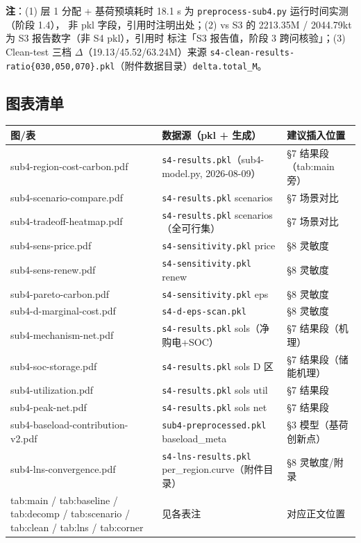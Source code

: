 \documentclass{internal-report}
\begin{document}
\textbf{注}：(1) 层 1 分配 + 基荷预填耗时 18.1 s 为 \texttt{preprocess-sub4.py} 运行时间实测（阶段 1.4），
非 pkl 字段，引用时注明出处；(2) vs S3 的 2213.35M / 2044.79kt 为 S3 报告数字（非 S4 pkl），引用时
标注「S3 报告值，阶段 3 跨问核验」；(3) Clean-test 三档 $\Delta$（19.13/45.52/63.24M）来源
\texttt{s4-clean-results-ratio\{030,050,070\}.pkl}（附件数据目录）\texttt{delta.total\_M}。

\subsection{图表清单}

\begin{center}
\footnotesize
\begin{tabular}{>{\raggedright\arraybackslash}p{5.0cm} >{\raggedright\arraybackslash}p{6.6cm} >{\raggedright\arraybackslash}p{3.2cm}}
\toprule
图/表 & 数据源（pkl + 生成） & 建议插入位置 \\
\midrule
sub4-region-cost-carbon.pdf & \texttt{s4-results.pkl}（sub4-model.py, 2026-08-09） & §7 结果段（tab:main 旁） \\
sub4-scenario-compare.pdf & \texttt{s4-results.pkl} scenarios & §7 场景对比 \\
sub4-tradeoff-heatmap.pdf & \texttt{s4-results.pkl} scenarios（全可行集） & §7 场景对比 \\
sub4-sens-price.pdf & \texttt{s4-sensitivity.pkl} price & §8 灵敏度 \\
sub4-sens-renew.pdf & \texttt{s4-sensitivity.pkl} renew & §8 灵敏度 \\
sub4-pareto-carbon.pdf & \texttt{s4-sensitivity.pkl} eps & §8 灵敏度 \\
sub4-d-marginal-cost.pdf & \texttt{s4-d-eps-scan.pkl} & §8 灵敏度 \\
sub4-mechanism-net.pdf & \texttt{s4-results.pkl} sols（净购电+SOC） & §7 结果段（机理） \\
sub4-soc-storage.pdf & \texttt{s4-results.pkl} sols D 区 & §7 结果段（储能机理） \\
sub4-utilization.pdf & \texttt{s4-results.pkl} sols util & §7 结果段 \\
sub4-peak-net.pdf & \texttt{s4-results.pkl} sols net & §7 结果段 \\
sub4-baseload-contribution-v2.pdf & \texttt{sub4-preprocessed.pkl} baseload\_meta & §3 模型（基荷创新点） \\
sub4-lns-convergence.pdf & \texttt{s4-lns-results.pkl} per\_region.curve（附件目录） & §8 灵敏度/附录 \\
tab:main / tab:baseline / tab:decomp / tab:scenario / tab:clean / tab:lns / tab:corner & 见各表注 & 对应正文位置 \\
\bottomrule
\end{tabular}
\end{center}
\end{document}
